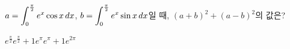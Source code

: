 \hspace*{2mm}\begin{minipage}[t]{\dimexpr\linewidth-2mm\relax}\vspace{0pt}
$a=\displaystyle\int_{0}^{\frac{\pi}{2}}e^x\cos x\mkern3mu dx$, $b=\displaystyle\int_{0}^{\frac{\pi}{2}}e^x\sin x\mkern3mu dx$일 때, $(a+b)^2+(a-b)^2$의 값은?
\begin{choices32}{$e^{\frac{\pi}{2}}$}{$e^{\frac{\pi}{2}}+1$}{$e^{\pi}$}{$e^{\pi}+1$}{$e^{2\pi}$}\end{choices32}\end{minipage}
